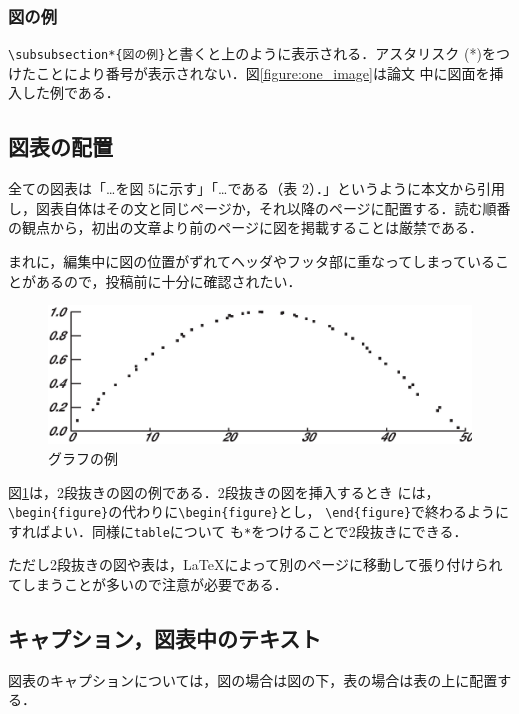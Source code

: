 \documentclass[twoside]{wiss}
\begin{document}
\subsubsection*{図の例}

\verb|\subsubsection*{図の例}|と書くと上のように表示される．アスタリスク
(*)をつけたことにより番号が表示されない．図\ref{figure:one_image}は論文
中に図面を挿入した例である．

\subsection*{図表の配置}
全ての図表は「…を図 5に示す」「…である（表 2）．」というように本文から引用し，図表自体はその文と同じページか，それ以降のページに配置する．読む順番の観点から，初出の文章より前のページに図を掲載することは厳禁である．

まれに，編集中に図の位置がずれてヘッダやフッタ部に重なってしまっていることがあるので，投稿前に十分に確認されたい．

\begin{figure}[ht]
\centering
\includegraphics[scale=0.6]{graph_.eps} 
\caption{グラフの例}
\label{figure:graph}
\end{figure} 

図\ref{figure:graph}は，2段抜きの図の例である．2段抜きの図を挿入するとき
には，\verb|\begin{figure}|の代わりに\verb|\begin{figure}|とし，
\verb|\end{figure}|で終わるようにすればよい．同様に\verb|table|について
も\verb|*|をつけることで2段抜きにできる．

ただし2段抜きの図や表は，\LaTeX によって別のページに移動して張り付けられ
てしまうことが多いので注意が必要である．

\subsection{キャプション，図表中のテキスト}
図表のキャプションについては，図の場合は図の下，表の場合は表の上に配置する．
\end{document}
